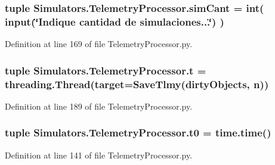 \hypertarget{namespace_simulators_1_1_telemetry_processor_a7fe4cce5cc73c8db7435572440377e9d}{}
\subsubsection[{sim\+Cant}]{\setlength{\rightskip}{0pt plus 5cm}tuple Simulators.\+Telemetry\+Processor.\+sim\+Cant = int( input(\char`\"{}Indique cantidad de simulaciones...\char`\"{}) )}\label{namespace_simulators_1_1_telemetry_processor_a7fe4cce5cc73c8db7435572440377e9d}


Definition at line 169 of file Telemetry\+Processor.\+py.

\hypertarget{namespace_simulators_1_1_telemetry_processor_a5c52853408a5a4a37c50b60b7051ef1f}{}
\subsubsection[{t}]{\setlength{\rightskip}{0pt plus 5cm}tuple Simulators.\+Telemetry\+Processor.\+t = threading.\+Thread(target={\bf Save\+Tlmy}({\bf dirty\+Objects}, {\bf n}))}\label{namespace_simulators_1_1_telemetry_processor_a5c52853408a5a4a37c50b60b7051ef1f}


Definition at line 189 of file Telemetry\+Processor.\+py.

\hypertarget{namespace_simulators_1_1_telemetry_processor_a8856d395177605add01698b1a6a13c0a}{}
\subsubsection[{t0}]{\setlength{\rightskip}{0pt plus 5cm}tuple Simulators.\+Telemetry\+Processor.\+t0 = time.\+time()}\label{namespace_simulators_1_1_telemetry_processor_a8856d395177605add01698b1a6a13c0a}


Definition at line 141 of file Telemetry\+Processor.\+py.

\hypertarget{namespace_simulators_1_1_telemetry_processor_a12bc7f6b923142a1a0cc282b21648fd5}{}

